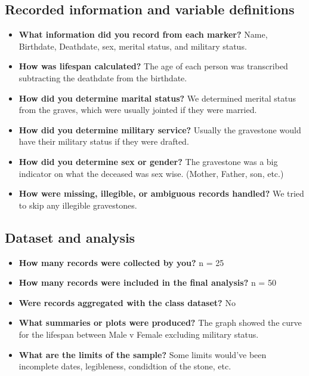\documentclass[
  10pt,
  twocolumn]{article}
\providecommand{\tightlist}{%
  \setlength{\itemsep}{0pt}\setlength{\parskip}{0pt}}
\begin{document}
\subsection{Recorded information and variable
definitions}\label{recorded-information-and-variable-definitions}

\begin{itemize}
\tightlist
\item
  \textbf{What information did you record from each marker?} Name,
  Birthdate, Deathdate, sex, merital status, and military status.
\item
  \textbf{How was lifespan calculated?} The age of each person was
  transcribed subtracting the deathdate from the birthdate.
\item
  \textbf{How did you determine marital status?} We determined merital
  status from the graves, which were usually jointed if they were
  married.
\item
  \textbf{How did you determine military service?} Usually the
  gravestone would have their military status if they were drafted.
\item
  \textbf{How did you determine sex or gender?} The gravestone was a big
  indicator on what the deceased was sex wise. (Mother, Father, son,
  etc.)
\item
  \textbf{How were missing, illegible, or ambiguous records handled?} We
  tried to skip any illegible gravestones.
\end{itemize}

\subsection{Dataset and analysis}\label{dataset-and-analysis}

\begin{itemize}
\tightlist
\item
  \textbf{How many records were collected by you?} n = 25
\item
  \textbf{How many records were included in the final analysis?} n = 50
\item
  \textbf{Were records aggregated with the class dataset?} No
\item
  \textbf{What summaries or plots were produced?} The graph showed the
  curve for the lifespan between Male v Female excluding military
  status.
\item
  \textbf{What are the limits of the sample?} Some limits would've been
  incomplete dates, legibleness, condidtion of the stone, etc.
\end{itemize}
\end{document}
